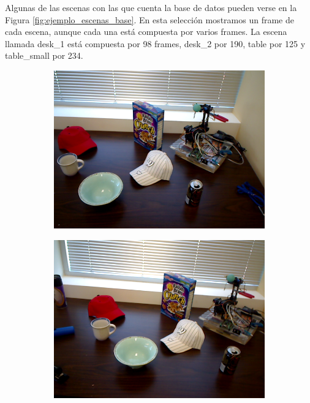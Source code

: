 Algunas de las escenas con las que cuenta la base de datos pueden verse en la Figura \ref{fig:ejemplo_escenas_base}. En esta selección mostramos un frame de cada escena, aunque cada una está compuesta por varios frames. La escena llamada desk\_1 está compuesta por 98 frames, desk\_2 por 190, table por 125 y table\_small por 234.


\begin{figure}[t]
    \centering
    \begin{subfigure}[b]{0.3\textwidth}
        \includegraphics[width=\textwidth]{img/escena_rgbd/table_1_27.png}
    \end{subfigure}
    \quad
    \begin{subfigure}[b]{0.3\textwidth}
        \includegraphics[width=\textwidth]{img/escena_rgbd/table_1_34.png}

\end{subfigure}
\end{figure}
